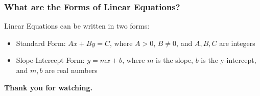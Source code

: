 \documentclass[14pt]{beamer}
\begin{document}
\begin{frame}
	\frametitle{What are the Forms of Linear Equations?}
	Linear Equations can be written in two forms: 
	
	\begin{itemize} 
		\item<2-> Standard Form: $ Ax+By=C $, where $ A > 0$, $ B \neq 0$, and $ A, B, C $ are integers 
		\item<3-> Slope-Intercept Form: $ y=mx+b $, where $ m $ is the slope, $ b $ is the y-intercept, and $ m, b $ are real numbers 
	\end{itemize} 
\end{frame}

    \begin{frame}
    	\begin{center}
    		\textbf{\LARGE Thank you for watching.}
    	\end{center}
    \end{frame}
	
\end{document}
